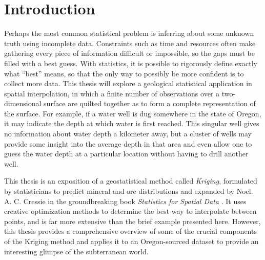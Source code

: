 \documentclass[12pt,twoside]{reedthesis}
\begin{document}
  \mainmatter %
  \pagestyle{fancyplain} %


    \chapter*{Introduction}
	
Perhaps the most common statistical problem is inferring about some unknown truth using incomplete data. Constraints such as time and resources often make gathering every piece of information difficult or impossible, so the gaps must be filled with a best guess. With statistics, it is possible to rigorously define exactly what ``best'' means, so that the only way to possibly be more confident is to collect more data. This thesis will explore a geological statistical application in spatial interpolation, in which a finite number of observations over a two-dimensional surface are quilted together as to form a complete representation of the surface. For example, if a water well is dug somewhere in the state of Oregon, it may indicate the depth at which water is first reached. This singular well gives no information about water depth a kilometer away, but a cluster of wells may provide some insight into the average depth in that area and even allow one to guess the water depth at a particular location without having to drill another well. 

This thesis is an exposition of a geostatistical method called \emph{Kriging}, formulated by statisticians to predict mineral and ore distributions and expanded by Noel. A. C. Cressie in the groundbreaking book \emph{Statistics for Spatial Data} \cite{cressie:1993}. It uses creative optimization methods to determine the best way to interpolate between points, and is far more extensive than the brief example presented here. However, this thesis provides a comprehensive overview of some of the crucial components of the Kriging method and applies it to an Oregon-sourced dataset to provide an interesting glimpse of the subterranean world. 
	
	

	
	
	
\end{document}
